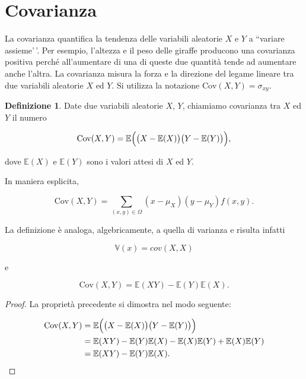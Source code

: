 \documentclass[
  11pt,
]{krantz}
\theoremstyle{definition}
\newtheorem{definition}{Definizione}[chapter]
\theoremstyle{definition}
\theoremstyle{definition}
\theoremstyle{definition}
\theoremstyle{remark}
\begin{document}
\hypertarget{covarianza}{%
\section{Covarianza}\label{covarianza}}

La covarianza quantifica la tendenza delle variabili aleatorie \(X\) e \(Y\) a ``variare assieme'\,'. Per esempio, l'altezza e il peso delle giraffe producono una covarianza positiva perché all'aumentare di una di queste due quantità tende ad aumentare anche l'altra. La covarianza misura la forza e la direzione del legame lineare tra due variabili aleatorie \(X\) ed \(Y\). Si utilizza la notazione \(\mbox{Cov}(X,Y)=\sigma_{xy}\).

\begin{definition}
Date due variabili aleatorie \(X\), \(Y\), chiamiamo covarianza tra \(X\) ed \(Y\) il numero

\begin{equation}
\mbox{Cov}(X,Y) = \mathbb{E}\Bigl(\bigl(X - \mathbb{E}(X)\bigr) \bigl(Y - \mathbb{E}(Y)\bigr)\Bigr),
\end{equation}

dove \(\mathbb{E}(X)\) e \(\mathbb{E}(Y)\) sono i valori attesi di \(X\) ed \(Y\).
\end{definition}

In maniera esplicita,

\begin{equation}
\mbox{Cov}(X,Y) = \sum_{(x,y) \in \Omega} (x - \mu_X) (y - \mu_Y) f(x, y).
\label{eq:cov_def}
\end{equation}

La definizione è analoga, algebricamente, a quella di varianza e risulta infatti

\begin{equation}
\mathbb{V}(x) = cov(X, X)
\end{equation}

e

\begin{equation}
\mbox{Cov}(X,Y) = \mathbb{E}(XY) - \mathbb{E}(Y)\mathbb{E}(X).
\label{eq:cov_vc_alt}
\end{equation}

\begin{proof}
La proprietà precedente si dimostra nel modo seguente:

\begin{align}
\mbox{Cov}(X,Y) &= \mathbb{E}\Bigl(\bigl(X-\mathbb{E}(X)\bigr) \bigl(Y-\mathbb{E}(Y)\bigr)\Bigr)\notag\\
          &= \mathbb{E}(XY) - \mathbb{E}(Y)\mathbb{E}(X) - \mathbb{E}(X)\mathbb{E}(Y) + \mathbb{E}(X)\mathbb{E}(Y)\notag\\
          &= \mathbb{E}(XY) - \mathbb{E}(Y)\mathbb{E}(X)\notag.
\end{align}
\end{proof}
\end{document}

